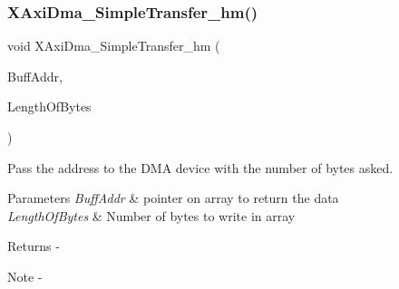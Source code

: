 \subsubsection{XAxiDma\_SimpleTransfer\_hm()}
{\footnotesize\ttfamily void X\+Axi\+Dma\+\_\+\+Simple\+Transfer\+\_\+hm (\begin{DoxyParamCaption}\item[{U\+I\+N\+T\+P\+TR}]{Buff\+Addr,  }\item[{int}]{Length\+Of\+Bytes }\end{DoxyParamCaption})}



Pass the address to the D\+MA device with the number of bytes asked. 


\begin{DoxyParams}{Parameters}
{\em Buff\+Addr} & pointer on array to return the data \\
\hline
{\em Length\+Of\+Bytes} & Number of bytes to write in array\\
\hline
\end{DoxyParams}
\begin{DoxyReturn}{Returns}
-\/
\end{DoxyReturn}
\begin{DoxyNote}{Note}
-\/ 
\end{DoxyNote}
